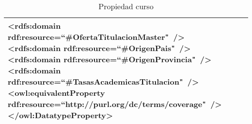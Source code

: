\begin{table}[!ht]
\begin{tabular}{|p{}|p{}|}
		\tab\textless rdfs:domain\newline
		\tab\tab rdf:resource=``\#OfertaTitulacionMaster"\ /\textgreater\newline
		\tab\textless rdfs:domain\newline
		\tab\tab rdf:resource=``\#OrigenPais"\ /\textgreater\newline
		\tab\textless rdfs:domain\newline
		\tab\tab rdf:resource=``\#OrigenProvincia"\ /\textgreater\newline
		\tab\textless rdfs:domain\newline
		\tab\tab rdf:resource=``\#TasasAcademicasTitulacion"\ /\textgreater\newline
		\tab\textless owl:equivalentProperty\newline
		\tab\tab rdf:resource=``http://purl.org/dc/terms/coverage"\  /\textgreater\newline
		\textless /owl:DatatypeProperty\textgreater
		\\ \hline
	\end{tabular}
	\caption{Propiedad curso}
	\label{propiedad-curso}
\end{table}

